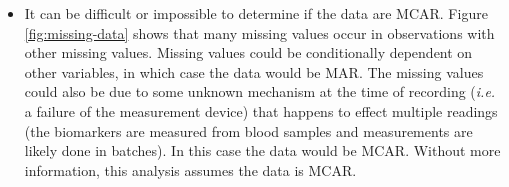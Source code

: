 \documentclass[12pt,]{article}
\providecommand{\tightlist}{%
  \setlength{\itemsep}{0pt}\setlength{\parskip}{0pt}}
\begin{document}
\begin{itemize}
\tightlist
\item
  It can be difficult or impossible to determine if the data are MCAR.
  Figure \ref{fig:missing-data} shows that many missing values occur in
  observations with other missing values. Missing values could be
  conditionally dependent on other variables, in which case the data
  would be MAR. The missing values could also be due to some unknown
  mechanism at the time of recording (\emph{i.e.} a failure of the
  measurement device) that happens to effect multiple readings (the
  biomarkers are measured from blood samples and measurements are likely
  done in batches). In this case the data would be MCAR. Without more
  information, this analysis assumes the data is MCAR.
\end{itemize}
\end{document}
